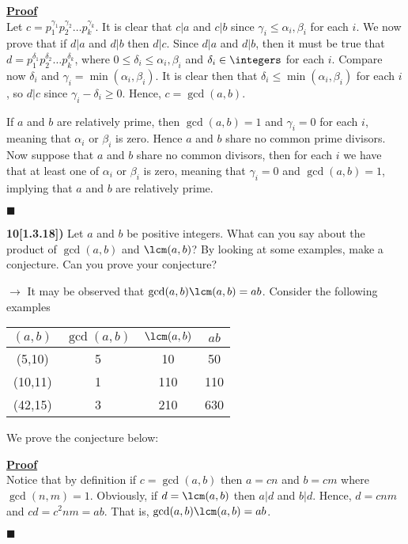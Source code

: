 \documentclass[12pt,a4paper]{article}
\newcommand{\prob}[2]{\textbf{#1)} #2}
\newenvironment{proof}
{
\textbf{\underline{Proof}} \\
}
{
\begin{flushright}
$\blacksquare$
\end{flushright}}
\begin{document}
\begin{proof}
Let $c = p_1^{\gamma_1}p_2^{\gamma_2}\hdots p_k^{\gamma_k}$. It is clear that $c|a$ and $c|b$ since $\gamma_i \leq \alpha_i,\beta_i$ for each $i$. We now prove that if $d|a$ and $d|b$ then $d|c$. Since $d|a$ and $d|b$, then it must be true that $d = p_1^{\delta_1}p_2^{\delta_2}\hdots p_k^{\delta_k}$, where $0 \leq \delta_i \leq \alpha_i,\beta_i$ and $\delta_i \in \integers$ for each $i$. Compare now $\delta_i$ and $\gamma_i = \min(\alpha_i,\beta_i)$. It is clear then that $\delta_i \leq \min(\alpha_i,\beta_i)$ for each $i$, so $d|c$ since $\gamma_i - \delta_i \geq 0$. Hence, $c = \gcd(a,b)$.

If $a$ and $b$ are relatively prime, then $\gcd(a,b) = 1$ and $\gamma_i = 0$ for each $i$, meaning that $\alpha_i$ or $\beta_i$ is zero. Hence $a$ and $b$ share no common prime divisors. Now suppose that $a$ and $b$ share no common divisors, then for each $i$ we have that at least one of $\alpha_i$ or $\beta_i$ is zero, meaning that $\gamma_i = 0$ and $\gcd(a,b) = 1$, implying that $a$ and $b$ are relatively prime.
\end{proof}

\prob{10[1.3.18]}{Let $a$ and $b$ be positive integers. What can you say about the product of $\gcd(a,b)$ and $\lcm(a,b)$? By looking at some examples, make a conjecture. Can you prove your conjecture?}

$\rightarrow$ It may be observed that $\gcd(a,b)\lcm(a,b) = ab$. Consider the following examples

\begin{table}[H]
\begin{center}
\begin{tabular}{c|c|c|c}
$(a,b)$ & $\gcd(a,b)$ & $\lcm(a,b)$ & $ab$ \\
\hline
(5,10) & 5 & 10 & 50 \\
(10,11) & 1 & 110 & 110 \\
(42,15) & 3 & 210 & 630 \\
\end{tabular}
\end{center}
\end{table}

We prove the conjecture below:

\begin{proof}
Notice that by definition if $c = \gcd(a,b)$ then $a = cn$ and $b = cm$ where $\gcd(n,m) = 1$. Obviously, if $d = \lcm(a,b)$ then $a|d$ and $b|d$. Hence, $d = cnm$ and $cd = c^2nm = ab$. That is, $\gcd(a,b)\lcm(a,b) = ab$.
\end{proof}
\end{document}
